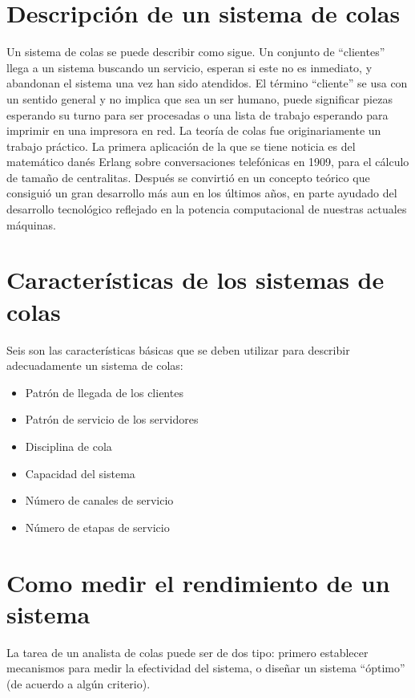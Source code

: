 \documentclass[]{article}
\providecommand{\tightlist}{%
  \setlength{\itemsep}{0pt}\setlength{\parskip}{0pt}}
\begin{document}
\section{Descripción de un sistema de
colas}\label{descripcion-de-un-sistema-de-colas}

Un sistema de colas se puede describir como sigue. Un conjunto de
``clientes'' llega a un sistema buscando un servicio, esperan si este no
es inmediato, y abandonan el sistema una vez han sido atendidos. El
término ``cliente'' se usa con un sentido general y no implica que sea
un ser humano, puede significar piezas esperando su turno para ser
procesadas o una lista de trabajo esperando para imprimir en una
impresora en red. La teoría de colas fue originariamente un trabajo
práctico. La primera aplicación de la que se tiene noticia es del
matemático danés Erlang sobre conversaciones telefónicas en 1909, para
el cálculo de tamaño de centralitas. Después se convirtió en un concepto
teórico que consiguió un gran desarrollo más aun en los últimos años, en
parte ayudado del desarrollo tecnológico reflejado en la potencia
computacional de nuestras actuales máquinas.

\section{Características de los sistemas de
colas}\label{caracteristicas-de-los-sistemas-de-colas}

Seis son las características básicas que se deben utilizar para
describir adecuadamente un sistema de colas:

\begin{itemize}
\tightlist
\item
  Patrón de llegada de los clientes
\item
  Patrón de servicio de los servidores
\item
  Disciplina de cola
\item
  Capacidad del sistema
\item
  Número de canales de servicio
\item
  Número de etapas de servicio
\end{itemize}

\section{Como medir el rendimiento de un
sistema}\label{como-medir-el-rendimiento-de-un-sistema}

La tarea de un analista de colas puede ser de dos tipo: primero
establecer mecanismos para medir la efectividad del sistema, o diseñar
un sistema ``óptimo'' (de acuerdo a algún criterio).
\end{document}
